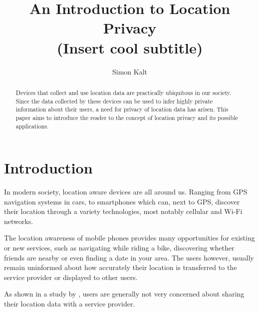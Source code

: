 \documentclass[twocolumn, a4paper, 10pt]{article}
\begin{document}
\title{
    {\Large An Introduction to Location Privacy \\}
    {\large (Insert cool subtitle)}
}

\author{
    Simon Kalt
}

\maketitle

\def\abstractname{Abstract}
\begin{abstract}
{
Devices that collect and use location data are practically ubiquitous in our society. Since the data collected by these devices can be used to infer highly private information about their users, a need for privacy of location data has arisen. This paper aims to introduce the reader to the concept of location privacy and its possible applications.
}
\end{abstract}


\section{Introduction}
\label{sec:introduction}
In modern society, location aware devices are all around us. Ranging from GPS navigation systems in cars, to smartphones which can, next to GPS, discover their location through a variety technologies, most notably cellular and Wi-Fi networks.

The location awareness of mobile phones provides many opportunities for existing or new services, such as navigating while riding a bike, discovering whether friends are nearby or even finding a date in your area. The users however, usually remain uninformed about how accurately their location is transferred to the service provider or displayed to other users.

As shown in a study by \citet{danezis2005much}, users are generally not very concerned about sharing their location data with a service provider.

\lipsum[1-2]


{
    
    
}

\appendix
\end{document}
